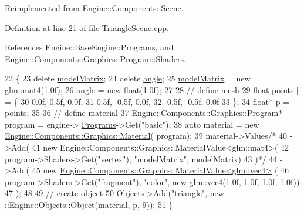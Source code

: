 Reimplemented from \mbox{\hyperlink{classEngine_1_1Components_1_1Scene_a23c5b23e66646443670a487e7c016e73}{Engine\+::\+Components\+::\+Scene}}.



Definition at line 21 of file Triangle\+Scene.\+cpp.



References Engine\+::\+Base\+Engine\+::\+Programs, and Engine\+::\+Components\+::\+Graphics\+::\+Program\+::\+Shaders.


\begin{DoxyCode}
22 \{
23     \textcolor{keyword}{delete} \mbox{\hyperlink{classApplication_1_1Scenes_1_1TriangleScene_a2c270015fd60f4aeb281474ddfdcd692}{modelMatrix}};
24     \textcolor{keyword}{delete} \mbox{\hyperlink{classApplication_1_1Scenes_1_1TriangleScene_a398daba41c0317ccb019d714bec0c795}{angle}};
25     \mbox{\hyperlink{classApplication_1_1Scenes_1_1TriangleScene_a2c270015fd60f4aeb281474ddfdcd692}{modelMatrix}} = \textcolor{keyword}{new} glm::mat4(1.0f);
26     \mbox{\hyperlink{classApplication_1_1Scenes_1_1TriangleScene_a398daba41c0317ccb019d714bec0c795}{angle}} = \textcolor{keyword}{new} float(1.0f);
27 
28     \textcolor{comment}{// define mesh}
29     \textcolor{keywordtype}{float} points[] = \{
30         0.0f, 0.5f, 0.0f,
31         0.5f, -0.5f, 0.0f,
32         -0.5f, -0.5f, 0.0f
33     \};
34     \textcolor{keywordtype}{float}* p = points;
35 
36     \textcolor{comment}{// define material}
37     \mbox{\hyperlink{classEngine_1_1Components_1_1Graphics_1_1Program}{Engine::Components::Graphics::Program}}* program = engine->
      \mbox{\hyperlink{classEngine_1_1BaseEngine_ae0f86360ea3a384caefe443dd8f88601}{Programs}}->Get(\textcolor{stringliteral}{"basic"});
38     \textcolor{keyword}{auto} material = \textcolor{keyword}{new} \mbox{\hyperlink{classEngine_1_1Components_1_1Graphics_1_1Material}{Engine::Components::Graphics::Material}}(
      program);
39     material->Values\textcolor{comment}{/*}
40 \textcolor{comment}{    ->Add(}
41 \textcolor{comment}{        new Engine::Components::Graphics::MaterialValue<glm::mat4>(}
42 \textcolor{comment}{        program->Shaders->Get("vertex"), "modelMatrix", modelMatrix)}
43 \textcolor{comment}{    )*/}
44     ->Add(
45         \textcolor{keyword}{new} \mbox{\hyperlink{classEngine_1_1Components_1_1Graphics_1_1MaterialValue}{Engine::Components::Graphics::MaterialValue<glm::vec4>}}
      (
46             program->\mbox{\hyperlink{classEngine_1_1Components_1_1Graphics_1_1Program_aff39fa56fc1fab1bce6c8a5ce29ae161}{Shaders}}->Get(\textcolor{stringliteral}{"fragment"}), \textcolor{stringliteral}{"color"}, \textcolor{keyword}{new} glm::vec4(1.0f, 1.0f, 1.0f, 1.0f))
47     );
48 
49     \textcolor{comment}{// create object}
50     \mbox{\hyperlink{classEngine_1_1Components_1_1Scene_a23481feabaaa56bf5613765db03af4da}{Objects}}->\mbox{\hyperlink{classGeneric_1_1Dictionary_ae7cb006f801b21c172e8fbac8794fa99}{Add}}(\textcolor{stringliteral}{"triangle"}, new ::Engine::Objects::Object(material, p, 9));
51 \}
\end{DoxyCode}
